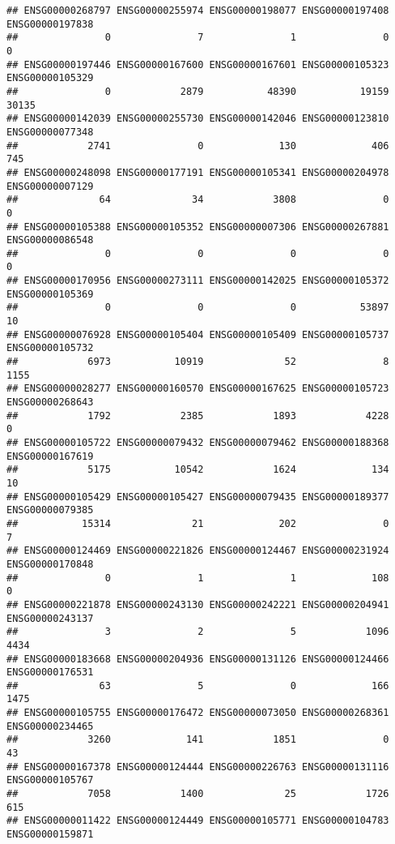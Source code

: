 \documentclass[
]{article}
\begin{document}
\begin{verbatim}
## ENSG00000268797 ENSG00000255974 ENSG00000198077 ENSG00000197408 ENSG00000197838 
##               0               7               1               0               0 
## ENSG00000197446 ENSG00000167600 ENSG00000167601 ENSG00000105323 ENSG00000105329 
##               0            2879           48390           19159           30135 
## ENSG00000142039 ENSG00000255730 ENSG00000142046 ENSG00000123810 ENSG00000077348 
##            2741               0             130             406             745 
## ENSG00000248098 ENSG00000177191 ENSG00000105341 ENSG00000204978 ENSG00000007129 
##              64              34            3808               0               0 
## ENSG00000105388 ENSG00000105352 ENSG00000007306 ENSG00000267881 ENSG00000086548 
##               0               0               0               0               0 
## ENSG00000170956 ENSG00000273111 ENSG00000142025 ENSG00000105372 ENSG00000105369 
##               0               0               0           53897              10 
## ENSG00000076928 ENSG00000105404 ENSG00000105409 ENSG00000105737 ENSG00000105732 
##            6973           10919              52               8            1155 
## ENSG00000028277 ENSG00000160570 ENSG00000167625 ENSG00000105723 ENSG00000268643 
##            1792            2385            1893            4228               0 
## ENSG00000105722 ENSG00000079432 ENSG00000079462 ENSG00000188368 ENSG00000167619 
##            5175           10542            1624             134              10 
## ENSG00000105429 ENSG00000105427 ENSG00000079435 ENSG00000189377 ENSG00000079385 
##           15314              21             202               0               7 
## ENSG00000124469 ENSG00000221826 ENSG00000124467 ENSG00000231924 ENSG00000170848 
##               0               1               1             108               0 
## ENSG00000221878 ENSG00000243130 ENSG00000242221 ENSG00000204941 ENSG00000243137 
##               3               2               5            1096            4434 
## ENSG00000183668 ENSG00000204936 ENSG00000131126 ENSG00000124466 ENSG00000176531 
##              63               5               0             166            1475 
## ENSG00000105755 ENSG00000176472 ENSG00000073050 ENSG00000268361 ENSG00000234465 
##            3260             141            1851               0              43 
## ENSG00000167378 ENSG00000124444 ENSG00000226763 ENSG00000131116 ENSG00000105767 
##            7058            1400              25            1726             615 
## ENSG00000011422 ENSG00000124449 ENSG00000105771 ENSG00000104783 ENSG00000159871 

\end{verbatim}
\end{document}
